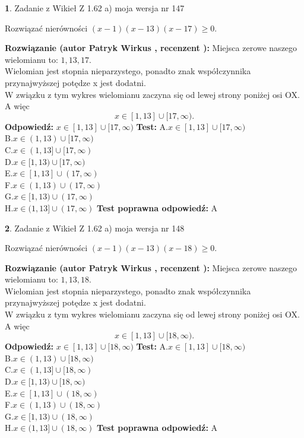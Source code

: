 \documentclass[12pt, a4paper]{article}
\theoremstyle{definition} %
\newtheorem{zad}{}
\newcommand{\zadStart}[1]{\begin{zad}#1\newline}
\newcommand{\zadStop}{\end{zad}}
\newcommand{\rozwStart}[2]{\noindent \textbf{Rozwiązanie (autor #1 , recenzent #2): }\newline}
\newcommand{\rozwStop}{\newline}
\newcommand{\odpStart}{\noindent \textbf{Odpowiedź:}\newline}
\newcommand{\odpStop}{\newline}
\newcommand{\testStart}{\noindent \textbf{Test:}\newline}
\newcommand{\testStop}{\newline}
\newcommand{\kluczStart}{\noindent \textbf{Test poprawna odpowiedź:}\newline}
\newcommand{\kluczStop}{\newline}
\begin{document}
\zadStart{Zadanie z Wikieł Z 1.62 a) moja wersja nr 147}

Rozwiązać nierówności $(x-1)(x-13)(x-17)\ge0$.
\zadStop
\rozwStart{Patryk Wirkus}{}
Miejsca zerowe naszego wielomianu to: $1, 13, 17$.\\
Wielomian jest stopnia nieparzystego, ponadto znak współczynnika przy\linebreak najwyższej potędze x jest dodatni.\\ W związku z tym wykres wielomianu zaczyna się od lewej strony poniżej osi OX. A więc $$x \in [1,13] \cup [17,\infty).$$
\rozwStop
\odpStart
$x \in [1,13] \cup [17,\infty)$
\odpStop
\testStart
A.$x \in [1,13] \cup [17,\infty)$\\
B.$x \in (1,13) \cup [17,\infty)$\\
C.$x \in (1,13] \cup [17,\infty)$\\
D.$x \in [1,13) \cup [17,\infty)$\\
E.$x \in [1,13] \cup (17,\infty)$\\
F.$x \in (1,13) \cup (17,\infty)$\\
G.$x \in [1,13) \cup (17,\infty)$\\
H.$x \in (1,13] \cup (17,\infty)$
\testStop
\kluczStart
A
\kluczStop



\zadStart{Zadanie z Wikieł Z 1.62 a) moja wersja nr 148}

Rozwiązać nierówności $(x-1)(x-13)(x-18)\ge0$.
\zadStop
\rozwStart{Patryk Wirkus}{}
Miejsca zerowe naszego wielomianu to: $1, 13, 18$.\\
Wielomian jest stopnia nieparzystego, ponadto znak współczynnika przy\linebreak najwyższej potędze x jest dodatni.\\ W związku z tym wykres wielomianu zaczyna się od lewej strony poniżej osi OX. A więc $$x \in [1,13] \cup [18,\infty).$$
\rozwStop
\odpStart
$x \in [1,13] \cup [18,\infty)$
\odpStop
\testStart
A.$x \in [1,13] \cup [18,\infty)$\\
B.$x \in (1,13) \cup [18,\infty)$\\
C.$x \in (1,13] \cup [18,\infty)$\\
D.$x \in [1,13) \cup [18,\infty)$\\
E.$x \in [1,13] \cup (18,\infty)$\\
F.$x \in (1,13) \cup (18,\infty)$\\
G.$x \in [1,13) \cup (18,\infty)$\\
H.$x \in (1,13] \cup (18,\infty)$
\testStop
\kluczStart
A
\kluczStop
\end{document}
